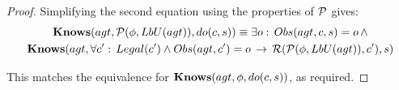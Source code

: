 \begin{proof}
Simplifying the second equation using the properties of $\mathcal{P}$ gives:\begin{multline*}
\mathbf{Knows}(agt,\mathcal{P}(\phi,LbU(agt)),do(c,s))\equiv\exists o:\, Obs(agt,c,s)=o\,\wedge\\
\mathbf{Knows}(agt,\forall c':\, Legal(c')\wedge Obs(agt,c')=o\,\rightarrow\,\mathcal{R}(\mathcal{P}(\phi,LbU(agt)),c'),s)\end{multline*}


This matches the equivalence for $\mathbf{Knows}(agt,\phi,do(c,s))$, as required.
\end{proof}

